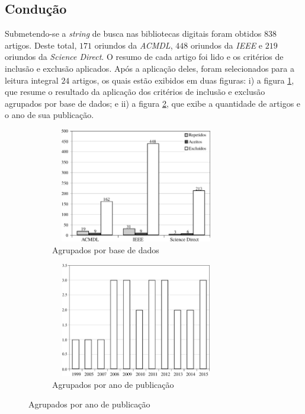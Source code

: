 \subsection{Condução}
Submetendo-se a \emph{string} de busca nas bibliotecas digitais foram obtidos \(838\) artigos. Deste total, \(171\) oriundos da \emph{ACMDL}, \(448\) oriundos da \emph{IEEE} e \(219\) oriundos da \emph{Science Direct}. O resumo de cada artigo foi lido e os critérios de inclusão e exclusão aplicados. Após a aplicação deles, foram selecionados para a leitura integral \(24\) artigos, os quais estão exibidos em duas figuras: i) a figura \ref{fig:figArtigosPorBase}, que resume o resultado da aplicação dos critérios de inclusão e exclusão agrupados por base de dados; e ii) a figura \ref{fig:figArtigosPorAno}, que exibe a quantidade de artigos e o ano de sua publicação.
\begin{figure}[!hbt]
\centering
\caption{Artigos obtidos com a revisão sistemática}
\begin{subfigure}{.5\textwidth}
  \centering
  \includegraphics[width=7.5cm, height=5cm]{./secoes/correlatos/pics/img/GraficoQuantidade.eps}
  \caption{Agrupados por base de dados}
  \label{fig:figArtigosPorBase}
\end{subfigure}%
\begin{subfigure}{.5\textwidth}
  \centering
  \includegraphics[width=7.5cm, height=5cm]{./secoes/correlatos/pics/img/GraficoQuantidadeAno.eps}
  \caption{Agrupados por ano de publicação}
  \label{fig:figArtigosPorAno}
\end{subfigure}
\label{fig}
\vspace{0.1cm}
 \source{\varAutorData}
\end{figure}

